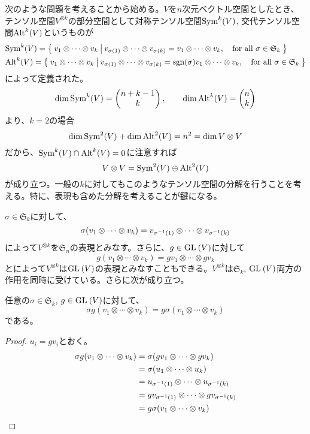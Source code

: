 \documentclass{ltjsreport}
\begin{document}
次のような問題を考えることから始める。$V$を$n$次元ベクトル空間としたとき、テンソル空間$V^{\otimes k}$の部分空間として対称テンソル空間$\text{Sym}^k(V)$, 交代テンソル空間$\text{Alt}^k(V)$というものが
\begin{align*}
  &\text{Sym}^k(V)=\left\{\:v_1\otimes\cdots\otimes v_k\:\middle|\:v_{\sigma(1)}\otimes\cdots\otimes v_{\sigma (k)}=v_1\otimes\cdots\otimes v_k,\quad\text{for all $\sigma\in\mathfrak{S}_k$}\:\right\}\\
  &\text{Alt}^k(V)=\left\{\:v_1\otimes\cdots\otimes v_k\:\middle|\:v_{\sigma(1)}\otimes\cdots\otimes v_{\sigma (k)}=\mathrm{sgn}(\sigma)v_1\otimes\cdots\otimes v_k,\quad\text{for all $\sigma\in\mathfrak{S}_k$}\:\right\}
\end{align*}
によって定義された。
\[
\dim\text{Sym}^k(V)=\begin{pmatrix} n+k-1\\k \end{pmatrix},\qquad\dim\text{Alt}^k(V)=\begin{pmatrix} n\\k \end{pmatrix}  
\]
より、$k=2$の場合
\[
\dim\text{Sym}^2(V)+\dim\text{Alt}^2(V)=n^2=\dim V\otimes V  
\]
だから、$\text{Sym}^k(V)\cap\text{Alt}^k(V)=0$に注意すれば
\[
V\otimes V=\text{Sym}^2(V)\oplus\text{Alt}^2(V)  
\]
が成り立つ。一般の$k$に対してもこのようなテンソル空間の分解を行うことを考える。特に、表現も含めた分解を考えることが鍵になる。

$\sigma\in \mathfrak{S}_k$に対して、
\[
\sigma(v_1\otimes\cdots\otimes v_k)=v_{\sigma^{-1}(1)}\otimes\cdots\otimes v_{\sigma^{-1}(k)}  
\]
によって$V^{\otimes k}$を$\mathfrak{S}_n$の表現とみなす。さらに、$g\in \text{GL}\:(V)$に対して
\[
g(v_1\otimes\cdots\otimes v_k)=gv_1\otimes\cdots\otimes gv_k  
\]
とによって$V^{\otimes k}$は$\text{GL}\:(V)$の表現とみなすこともできる。$V^{\otimes k}$は$\mathfrak{S}_k$, $\text{GL}\:(V)$両方の作用を同時に受けている。さらに次が成り立つ。

\begin{prop}\label{comm_of_sym_gl}
  任意の$\sigma\in\mathfrak{S}_k$, $g\in\text{GL}\:(V)$に対して、
  \[
  \sigma g(v_1\otimes\cdots\otimes v_k)
  =
  g \sigma(v_1\otimes\cdots\otimes v_k)
  \]
  である。
\end{prop}

\begin{proof}
  $u_i=gv_i$とおく。
  \begin{align*}
    \sigma g(v_1\otimes\cdots\otimes v_k)
    &=\sigma(gv_1\otimes\cdots\otimes gv_k)\\
    &=\sigma(u_1\otimes\cdots\otimes u_k)\\
    &=u_{\sigma^{-1}(1)}\otimes\cdots\otimes u_{\sigma^{-1}(k)}\\
    &=gv_{\sigma^{-1}(1)}\otimes\cdots\otimes gv_{\sigma^{-1}(k)}\\
    &=g\sigma (v_1\otimes\cdots\otimes v_k)
  \end{align*}
\end{proof}
\end{document}
